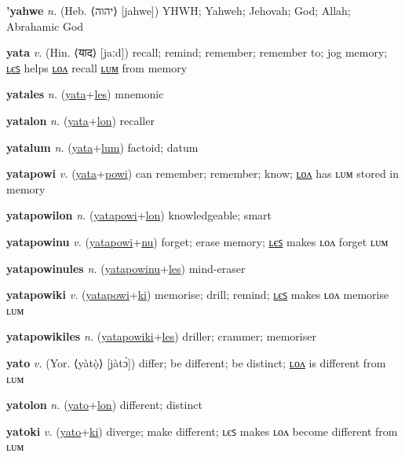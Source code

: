 \textbf{\hypertarget{'yahwe}{'yahwe}} \textit{n.} (Heb. ⟨{\hebrew{}יהוה‬}⟩ [jahwe])
YHWH; Yahweh; Jehovah; God; Allah; Abrahamic God

\textbf{\hypertarget{yata}{yata}} \textit{v.} (Hin. ⟨{\devanagari{}याद}⟩ [jaːd])
recall; remind; remember; remember to; jog memory; \hyperlink{yatales}{ʟєꜱ} helps \hyperlink{yatalon}{ʟᴏᴧ} recall \hyperlink{yatalum}{ʟᴜᴍ} from memory

\textbf{\hypertarget{yatales}{yatales}} \textit{n.} (\hyperlink{yata}{yata}+\allowbreak \hyperlink{les}{les})
mnemonic

\textbf{\hypertarget{yatalon}{yatalon}} \textit{n.} (\hyperlink{yata}{yata}+\allowbreak \hyperlink{lon}{lon})
recaller

\textbf{\hypertarget{yatalum}{yatalum}} \textit{n.} (\hyperlink{yata}{yata}+\allowbreak \hyperlink{lum}{lum})
factoid; datum

\textbf{\hypertarget{yatapowi}{yatapowi}} \textit{v.} (\hyperlink{yata}{yata}+\allowbreak \hyperlink{powi}{powi})
can remember; remember; know; \hyperlink{yatapowilon}{ʟᴏᴧ} has ʟᴜᴍ stored in memory

\textbf{\hypertarget{yatapowilon}{yatapowilon}} \textit{n.} (\hyperlink{yatapowi}{yatapowi}+\allowbreak \hyperlink{lon}{lon})
knowledgeable; smart

\textbf{\hypertarget{yatapowinu}{yatapowinu}} \textit{v.} (\hyperlink{yatapowi}{yatapowi}+\allowbreak \hyperlink{nu}{nu})
forget; erase memory; \hyperlink{yatapowinules}{ʟєꜱ} makes ʟᴏᴧ forget ʟᴜᴍ

\textbf{\hypertarget{yatapowinules}{yatapowinules}} \textit{n.} (\hyperlink{yatapowinu}{yatapowinu}+\allowbreak \hyperlink{les}{les})
mind-eraser

\textbf{\hypertarget{yatapowiki}{yatapowiki}} \textit{v.} (\hyperlink{yatapowi}{yatapowi}+\allowbreak \hyperlink{ki}{ki})
memorise; drill; remind; \hyperlink{yatapowikiles}{ʟєꜱ} makes ʟᴏᴧ memorise ʟᴜᴍ

\textbf{\hypertarget{yatapowikiles}{yatapowikiles}} \textit{n.} (\hyperlink{yatapowiki}{yatapowiki}+\allowbreak \hyperlink{les}{les})
driller; crammer; memoriser

\textbf{\hypertarget{yato}{yato}} \textit{v.} (Yor. ⟨yàtọ̀⟩ [jàtɔ̀])
differ; be different; be distinct; \hyperlink{yatolon}{ʟᴏᴧ} is different from ʟᴜᴍ

\textbf{\hypertarget{yatolon}{yatolon}} \textit{n.} (\hyperlink{yato}{yato}+\allowbreak \hyperlink{lon}{lon})
different; distinct

\textbf{\hypertarget{yatoki}{yatoki}} \textit{v.} (\hyperlink{yato}{yato}+\allowbreak \hyperlink{ki}{ki})
diverge; make different; ʟєꜱ makes ʟᴏᴧ become different from ʟᴜᴍ

